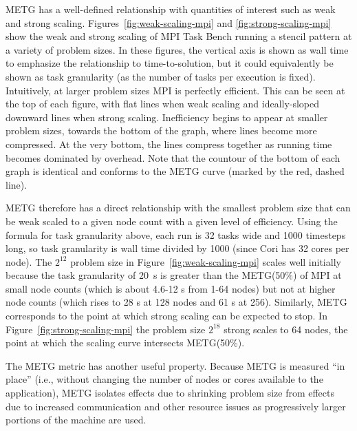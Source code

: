 METG has a well-defined
relationship with quantities of interest such as
weak and strong scaling. Figures~\ref{fig:weak-scaling-mpi} and
\ref{fig:strong-scaling-mpi} show the weak and strong scaling of MPI Task Bench running a stencil pattern at a variety of problem sizes. In these
figures, the vertical axis is shown as wall time to emphasize the
relationship to time-to-solution, but it could equivalently be shown
as task granularity (as the number of tasks per execution is
fixed). Intuitively, at
larger problem sizes MPI is perfectly efficient. This can be seen at
the top of each figure, with flat lines when weak scaling and
ideally-sloped downward lines when strong scaling. Inefficiency begins
to appear at smaller problem sizes, towards the bottom of the graph,
where lines become more compressed. At the
very bottom, the lines compress together as running time becomes
dominated by overhead. Note that the countour of the bottom of each
graph is identical and conforms to the METG curve (marked by the red,
dashed line).



METG therefore has a direct relationship with the smallest problem
size that can be weak scaled to a given node count with a given level
of efficiency. Using the formula for task granularity above, each run
is 32 tasks wide and 1000 timesteps long, so task granularity is wall
time divided by 1000 (since Cori has 32 cores per node). The $2^{12}$
problem size in Figure~\ref{fig:weak-scaling-mpi} scales well
initially because the task granularity of 20~\textmu{}s is greater
than the METG(50\%) of MPI at small node counts (which is about 4.6-12
\textmu{}s from 1-64 nodes) but not at higher node counts (which rises
to 28 \textmu{}s at 128 nodes and 61 \textmu{}s at 256). Similarly,
METG corresponds to the point at which strong scaling can be expected
to stop. In Figure~\ref{fig:strong-scaling-mpi} the problem size
$2^{18}$ strong scales to 64 nodes, the point at which the
scaling curve intersects METG(50\%).

The METG metric has another useful property. Because METG is measured ``in place'' (i.e.,
without changing the number of nodes or cores available to the
application), METG isolates effects
due to shrinking problem size from effects due to
increased communication and other resource issues as
progressively larger portions of the machine are used.
